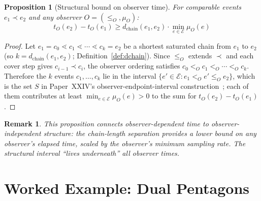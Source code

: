\documentclass[12pt]{article}
\newtheorem{proposition}[theorem]{Proposition}
\newtheorem{remark}[theorem]{Remark}
\newcommand{\Ecal}{\mathcal{E}}
\begin{document}
\begin{proposition}[Structural bound on observer time]\label{prop:bound}
For comparable events $e_1 \prec e_2$ and any observer $O = (\leq_O, \mu_O)$:
\begin{equation}
    t_O(e_2) - t_O(e_1) \geq d_{\mathrm{chain}}(e_1, e_2) \cdot \min_{e \in \Ecal} \mu_O(e)
\end{equation}
\end{proposition}

\begin{proof}
Let $e_1 = c_0 \lessdot c_1 \lessdot \cdots \lessdot c_k = e_2$ be a shortest saturated chain from $e_1$ to $e_2$ (so $k = d_{\mathrm{chain}}(e_1, e_2)$; Definition~\ref{def:dchain}). Since $\leq_O$ extends $\prec$ and each cover step gives $c_{i-1} \prec c_i$, the observer ordering satisfies $c_0 <_O c_1 <_O \cdots <_O c_k$. Therefore the $k$ events $c_1, \ldots, c_k$ lie in the interval $\{e' \in \Ecal : e_1 <_O e' \leq_O e_2\}$, which is the set $S$ in Paper~XXIV's observer-endpoint-interval construction~\citep{SmartXXIV}; each of them contributes at least $\min_{e \in \Ecal} \mu_O(e) > 0$ to the sum for $t_O(e_2) - t_O(e_1)$.
\end{proof}

\begin{remark}
This proposition connects observer-dependent time to observer-independent structure: the chain-length separation provides a lower bound on any observer's elapsed time, scaled by the observer's minimum sampling rate. The structural interval ``lives underneath'' all observer times.
\end{remark}

\section{Worked Example: Dual Pentagons}\label{sec:example}
\end{document}
